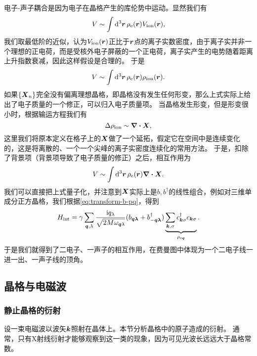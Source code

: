 \documentclass[hyperref, UTF8, a4paper]{ctexart}
\newcommand*{\ii}{\mathrm{i}}
\begin{document}
电子-声子耦合是因为电子在晶格产生的库伦势中运动。显然我们有
\[
    V \sim \int \dd[3]{\vb*{r}} \rho_\text{e}(\vb*{r}) V_\text{ion}(\vb*{r}),
\]
我们取最低阶的近似，认为$V_\text{ion}(\vb*{r})$正比于$\vb*{r}$点的离子实数密度，由于离子实并非一个理想的正电荷，而是受核外电子屏蔽的一个正电荷，离子实产生的电势随着距离上升指数衰减，因此这样假设是合理的。
于是
\[
    V \sim \int \dd[3]{\vb*{r}} \rho_\text{e}(\vb*{r}) \rho_\text{ion}(\vb*{r}).
\]
如果$\{\vb*{X}_n\}$完全没有偏离理想晶格，即晶格没有发生任何形变，那么上式实际上给出了电子质量的一个修正，可以归入电子质量项。
当晶格发生形变，但是形变很小时，根据输运方程我们有
\[
    \Delta \rho_\text{ion} \sim \div{\vb*{X}},
\]
这里我们将原本定义在格子上的$\vb*{X}$做了一个延拓，假定它在空间中是连续变化的，这是将离散的、一个一个尖峰的离子实密度连续化的常用方法。
于是，扣除了背景项（背景项导致了电子质量的修正）之后，相互作用为
\[
    V \sim \int \dd[3]{\vb*{r}} \rho_\text{e}(\vb*{r}) \div{\vb*{X}}.
\]
我们可以直接把上式量子化，并注意到${\vb*{X}}$实际上是${b}, {b}^\dagger$的线性组合，例如对三维单成分正方晶格，我们根据\eqref{eq:transform-b-pq}，得到
\begin{equation}
    {H}_\text{int} = \gamma \sum_{\vb*{q}, \lambda} \frac{\ii q_\lambda}{\sqrt{2 M \omega_{\vb*{q} \lambda}}} ({b}_{\vb*{q} \vb*{\lambda}} + {b}^\dagger_{-\vb*{q} \vb*{\lambda}}) \underbrace{\sum_{\vb*{k}, \sigma} {c}^\dagger_{\vb*{k} \sigma} {c}_{\vb*{k} \sigma}}_{{\rho}_{\text{e} \vb*{q}}}.
    \label{eq:simple-phonon-electron-int}
\end{equation}
于是我们就得到了二电子、一声子的相互作用，在费曼图中体现为一个二电子线一进一出、一声子线的顶角。

\subsection{晶格与电磁波}

\subsubsection{静止晶格的衍射}

设一束电磁波以波矢$\vb*{k}$照射在晶体上。本节分析晶格中的原子造成的衍射。
通常，只有X射线衍射才能够观察到这一类的现象，因为可见光波长远远大于晶格常数。
\end{document}
